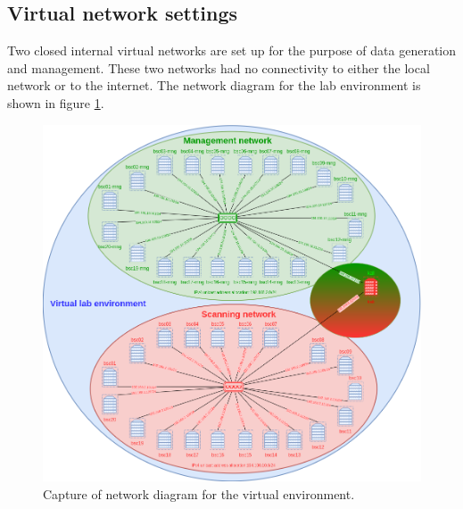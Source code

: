 \subsection{Virtual network settings}
\label{ss:VirtualNetworkSettings}

Two closed internal virtual networks are set up for the purpose of data generation and management.
These two networks had no connectivity to either the local network or to the internet.
The network diagram for the lab environment is shown in figure \ref{fig:LabNetwork}.

\begin{figure}[htbp]
\centerline{\includegraphics[scale=0.35]{images/LabNetwork.png}}
\caption{Capture of network diagram for the virtual environment.}
\label{fig:LabNetwork}
\end{figure}

